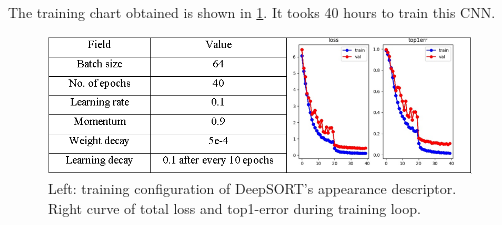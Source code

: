The training chart obtained is shown in \ref{fig:descriptor}. It tooks 40 hours to train this CNN.
\begin{figure}[!htb]
	\centering
	\includegraphics[width=\linewidth]{Figs/training_descriptor.png}
	\caption{Left: training configuration of DeepSORT’s appearance descriptor. Right curve of total loss and top1-error during training loop.}
	\label{fig:descriptor}
\end{figure}
